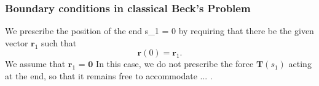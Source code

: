 
\subsubsection{Boundary conditions in classical Beck's Problem}

We prescribe the position of the end s_1 = 0 by requiring that there be the given vector $\mathbf{r}_1$ such that
\[ \mathbf{r}(0) = \mathbf{r}_1.\]
We assume that $\mathbf{r}_1$ = $\mathbf{0}$
In this case, we do not prescribe the force $\mathbf{T}(s_1)$ acting at the end, so that it remains free to accommodate ... .



